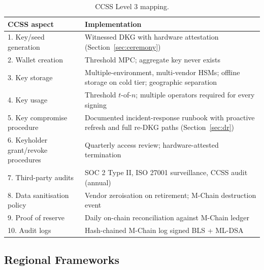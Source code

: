 \begin{table}[h]
\centering
\small
\begin{tabular}{p{4.5cm}p{9cm}}
\toprule
\textbf{CCSS aspect} & \textbf{Implementation} \\
\midrule
1. Key/seed generation &
Witnessed DKG with hardware attestation
(Section~\ref{sec:ceremony}) \\
2. Wallet creation &
Threshold MPC; aggregate key never exists \\
3. Key storage &
Multiple-environment, multi-vendor HSMs; offline storage on cold
tier; geographic separation \\
4. Key usage &
Threshold $t$-of-$n$; multiple operators required for every signing \\
5. Key compromise procedure &
Documented incident-response runbook with proactive refresh and full
re-DKG paths (Section~\ref{sec:dr}) \\
6. Keyholder grant/revoke procedures &
Quarterly access review; hardware-attested termination \\
7. Third-party audits &
SOC 2 Type II, ISO 27001 surveillance, CCSS audit (annual) \\
8. Data sanitisation policy &
Vendor zeroisation on retirement; M-Chain destruction event \\
9. Proof of reserve &
Daily on-chain reconciliation against M-Chain ledger \\
10. Audit logs &
Hash-chained M-Chain log signed BLS + ML-DSA \\
\bottomrule
\end{tabular}
\caption{CCSS Level 3 mapping.}
\label{tab:ccss}
\end{table}

\subsection{Regional Frameworks}

